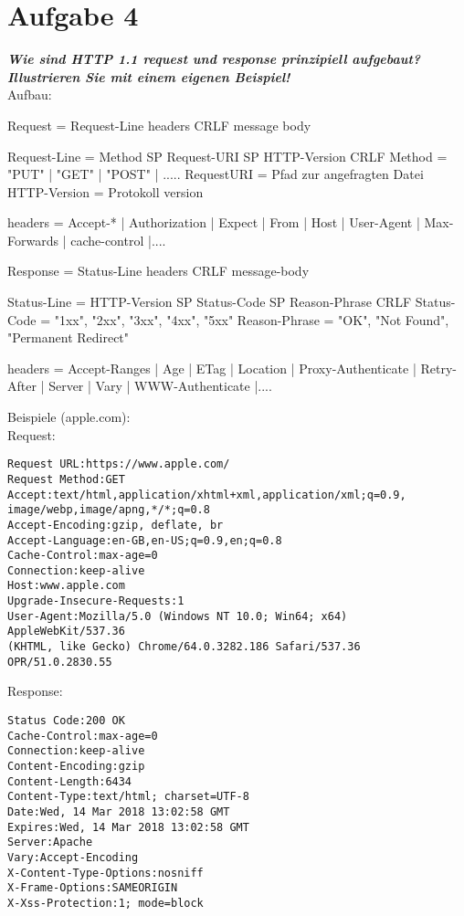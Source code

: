 \documentclass[12pt, a4paper]{report}
\begin{document}
\section*{Aufgabe 4}
\textbf{\textit{Wie sind HTTP 1.1 request und response prinzipiell aufgebaut? Illustrieren Sie mit einem
eigenen Beispiel!}}\\
Aufbau:
\begin{verbatimtab}
Request = Request-Line
	  headers
	  CRLF
	  message body

Request-Line = Method SP Request-URI SP HTTP-Version CRLF
Method 		 = "PUT" | "GET" | "POST" | .....
RequestURI   = Pfad zur angefragten Datei
HTTP-Version = Protokoll version

headers 	 = Accept-* | Authorization | Expect | From | Host
		| User-Agent | Max-Forwards | cache-control |....

Response = Status-Line
	   headers
	   CRLF
	   message-body

Status-Line   = HTTP-Version SP Status-Code SP Reason-Phrase CRLF
Status-Code   = "1xx", "2xx", "3xx", "4xx", "5xx"
Reason-Phrase = "OK", "Not Found", "Permanent Redirect"

headers = Accept-Ranges | Age | ETag | Location | Proxy-Authenticate
		| Retry-After | Server | Vary | WWW-Authenticate |....

\end{verbatimtab}
Beispiele (apple.com):\\
Request:\\
\begin{verbatim}
Request URL:https://www.apple.com/
Request Method:GET
Accept:text/html,application/xhtml+xml,application/xml;q=0.9,
image/webp,image/apng,*/*;q=0.8
Accept-Encoding:gzip, deflate, br
Accept-Language:en-GB,en-US;q=0.9,en;q=0.8
Cache-Control:max-age=0
Connection:keep-alive
Host:www.apple.com
Upgrade-Insecure-Requests:1
User-Agent:Mozilla/5.0 (Windows NT 10.0; Win64; x64) AppleWebKit/537.36
(KHTML, like Gecko) Chrome/64.0.3282.186 Safari/537.36 OPR/51.0.2830.55
\end{verbatim}

Response:\\
\begin{verbatim}
Status Code:200 OK
Cache-Control:max-age=0
Connection:keep-alive
Content-Encoding:gzip
Content-Length:6434
Content-Type:text/html; charset=UTF-8
Date:Wed, 14 Mar 2018 13:02:58 GMT
Expires:Wed, 14 Mar 2018 13:02:58 GMT
Server:Apache
Vary:Accept-Encoding
X-Content-Type-Options:nosniff
X-Frame-Options:SAMEORIGIN
X-Xss-Protection:1; mode=block
\end{verbatim}
\end{document}
